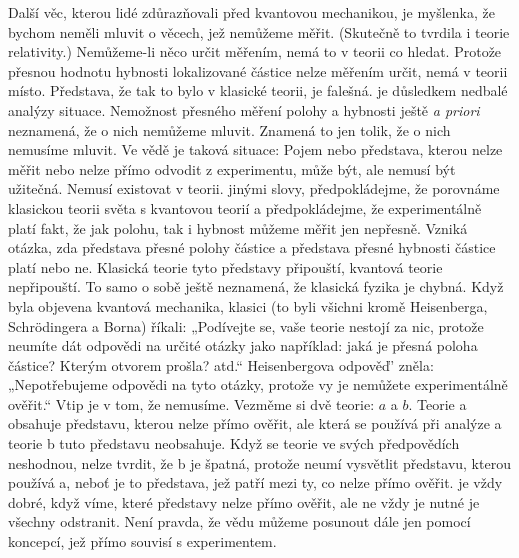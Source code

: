     Další věc, kterou lidé zdůrazňovali před kvantovou mechanikou, je myšlenka, že bychom neměli
    mluvit o věcech, jež nemůžeme měřit. (Skutečně to tvrdila i teorie relativity.) Nemůžeme-li něco
    určit měřením, nemá to v teorii co hledat. Protože přesnou hodnotu hybnosti lokalizované částice
    nelze měřením určit, nemá v teorii místo. Představa, že tak to bylo v klasické teorii, je
    falešná. je důsledkem nedbalé analýzy situace. Nemožnost přesného měření polohy a hybnosti ještě
    \emph{a priori} neznamená, že o nich nemůžeme mluvit. Znamená to jen tolik, že o nich nemusíme
    mluvit. Ve vědě je taková situace: Pojem nebo představa, kterou nelze měřit nebo nelze přímo
    odvodit z experimentu, může být, ale nemusí být užitečná. Nemusí existovat v teorii. jinými
    slovy, předpokládejme, že porovnáme klasickou teorii světa s kvantovou teorií a předpokládejme,
    že experimentálně platí fakt, že jak polohu, tak i hybnost můžeme měřit jen nepřesně. Vzniká
    otázka, zda představa přesné polohy částice a představa přesné hybnosti částice platí nebo ne.
    Klasická teorie tyto představy připouští, kvantová teorie nepřipouští. To samo o sobě ještě
    neznamená, že klasická fyzika je chybná. Když byla objevena kvantová mechanika, klasici (to byli
    všichni kromě Heisenberga, Schrödingera a Borna) říkali: „Podívejte se, vaše teorie nestojí za
    nic, protože neumíte dát odpovědi na určité otázky jako například: jaká je přesná poloha
    částice? Kterým otvorem prošla? atd.“ Heisenbergova odpověď' zněla: „Nepotřebujeme odpovědi na
    tyto otázky, protože vy je nemůžete experimentálně ověřit.“ Vtip je v tom, že nemusíme. Vezměme
    si dvě teorie: \(a\) a \(b\). Teorie a obsahuje představu, kterou nelze přímo ověřit, ale která
    se používá při analýze a teorie b tuto představu neobsahuje. Když se teorie ve svých
    předpovědích neshodnou, nelze tvrdit, že b je špatná, protože neumí vysvětlit představu, kterou
    používá a, neboť je to představa, jež patří mezi ty, co nelze přímo ověřit. je vždy dobré, když
    víme, které představy nelze přímo ověřit, ale ne vždy je nutné je všechny odstranit. Není
    pravda, že vědu můžeme posunout dále jen pomocí koncepcí, jež přímo souvisí s experimentem. 
    
